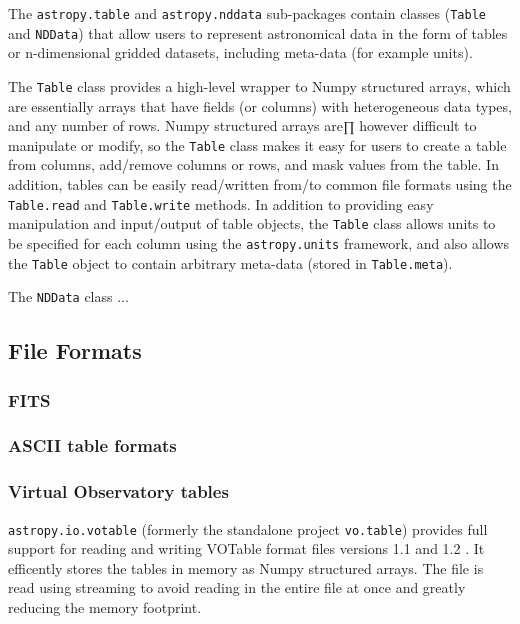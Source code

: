 \documentclass[traditabstract]{aa}
\begin{document}
The \texttt{astropy.table} and \texttt{astropy.nddata} sub-packages contain
classes (\texttt{Table} and \texttt{NDData}) that allow users to represent
astronomical data in the form of tables or n-dimensional gridded datasets,
including meta-data (for example units).

The \texttt{Table} class provides a high-level wrapper to Numpy structured
arrays, which are essentially arrays that have fields (or columns) with
heterogeneous data types, and any number of rows. Numpy structured arrays are∏
however difficult to manipulate or modify, so the \texttt{Table} class makes
it easy for users to create a table from columns, add/remove columns or rows,
and mask values from the table. In addition, tables can be easily
read/written from/to common file formats using the \texttt{Table.read} and
\texttt{Table.write} methods. In addition to providing easy manipulation and
input/output of table objects, the \texttt{Table} class allows units to be
specified for each column using the \texttt{astropy.units} framework, and
also allows the \texttt{Table} object to contain arbitrary meta-data (stored
in \texttt{Table.meta}).


The \texttt{NDData} class ...

\subsection{File Formats}


\subsubsection{FITS}



\subsubsection{ASCII table formats}



\subsubsection{Virtual Observatory tables}

\texttt{astropy.io.votable} (formerly the standalone project
\texttt{vo.table}) provides full support for reading and writing
VOTable format files versions 1.1 and 1.2
\citep{ochsenbein2004votable,ochsenbein2009votable}.  It efficently
stores the tables in memory as Numpy structured arrays.  The file is
read using streaming to avoid reading in the entire file at once and
greatly reducing the memory footprint.
\end{document}
